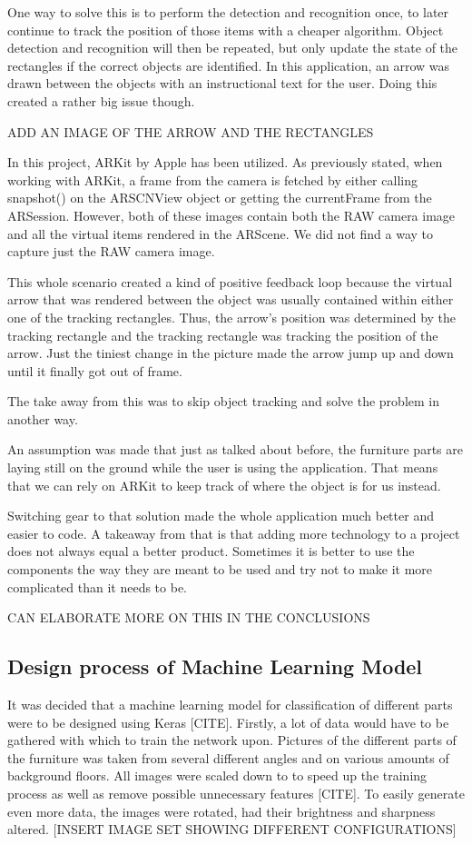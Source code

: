One way to solve this is to perform the detection and recognition once, to later continue to track the position of those items with a cheaper algorithm.
Object detection and recognition will then be repeated, but only update the state of the rectangles if the correct objects are identified.
In this application, an arrow was drawn between the objects with an instructional text for the user. Doing this created a rather big issue though.

ADD AN IMAGE OF THE ARROW AND THE RECTANGLES

In this project, ARKit by Apple has been utilized. As previously stated, when working with ARKit, a frame from the camera is fetched by either calling snapshot() on the ARSCNView object or getting the currentFrame from the ARSession.
However, both of these images contain both the RAW camera image and all the virtual items rendered in the ARScene. We did not find a way to capture just the RAW camera image.

This whole scenario created a kind of positive feedback loop because the virtual arrow that was rendered between the object was usually contained within either one of the tracking rectangles. Thus, the arrow's position was determined by the tracking rectangle and the tracking rectangle was tracking the position of the arrow.
Just the tiniest change in the picture made the arrow jump up and down until it finally got out of frame.

The take away from this was to skip object tracking and solve the problem in another way.

An assumption was made that just as talked about before, the furniture parts are laying still on the ground while the user is using the application. That means that we can rely on ARKit to keep track of where the object is for us instead.

Switching gear to that solution made the whole application much better and easier to code. A takeaway from that is that adding more technology to a project does not always equal a better product. Sometimes it is better to use the components the way they are meant to be used and try not to make it more complicated than it needs to be.

CAN ELABORATE MORE ON THIS IN THE CONCLUSIONS


\subsection{Design process of Machine Learning Model}
It was decided that a machine learning model for classification of different parts were to be designed using Keras [CITE]. Firstly, a lot of data would have to be gathered with which to train the network upon. Pictures of the different parts of the furniture was taken from several different angles and on various amounts of background floors. 
All images were scaled down to \imageSize to speed up the training process as well as remove possible unnecessary features [CITE]. To easily generate even more data, the images were rotated, had their brightness and sharpness altered. 
[INSERT IMAGE SET SHOWING DIFFERENT CONFIGURATIONS]
 
